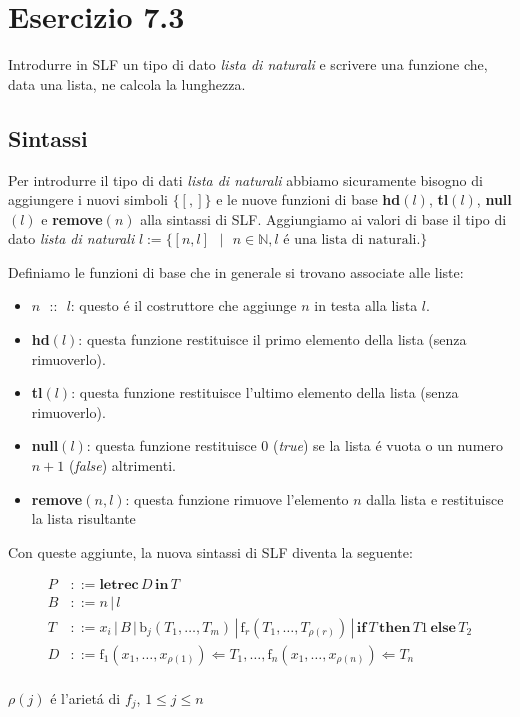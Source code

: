 		\newpage
		
	\section{Esercizio 7.3}
		\qquad Introdurre in SLF un tipo di dato \emph{lista di naturali} e scrivere
		una funzione che, data una lista, ne calcola la lunghezza.
		
		\sectionline
		
		\subsection{Sintassi}
		
		\qquad Per introdurre il tipo di dati \emph{lista di naturali} abbiamo
		sicuramente bisogno di aggiungere i nuovi simboli $\{[,]\}$ e le nuove
		funzioni di base \textbf{hd}$(l)$, \textbf{tl}$(l)$, \textbf{null}$(l)$ e
		\textbf{remove}$(n)$ alla sintassi di SLF. Aggiungiamo ai valori di base il tipo di dato
		\emph{lista di naturali} $l := \{[n,l]\text{ }|\text{ }n \in
		\mathbb{N},l\text{ \'e una lista di naturali.}\}$
		
		Definiamo le funzioni di base che in generale si trovano associate alle
		liste:
		\begin{itemize}
		  \item $n\text{ }\textbf{::}\text{ }l$: questo \'e il costruttore che aggiunge
		  $n$ in testa alla lista $l$.
		  \item \textbf{hd}$(l)$: questa funzione restituisce il primo elemento della
		  lista (senza rimuoverlo).
		  \item \textbf{tl}$(l)$: questa funzione restituisce l'ultimo elemento della
		  lista (senza rimuoverlo).
		  \item \textbf{null}$(l)$: questa funzione restituisce $0$ (\emph{true})
		  se la lista \'e vuota o un numero $n+1$ (\emph{false}) altrimenti.
		  \item \textbf{remove}$(n,l)$: questa funzione rimuove l'elemento $n$ dalla
		  lista e restituisce la lista risultante
		\end{itemize}

		Con queste aggiunte, la nuova sintassi di SLF diventa la seguente:
		
		\begin{align*}
			P & ::= \textbf{letrec} \, D \, \textbf{in} \, T\\
			B & ::= n \, | \, l\\
			T & ::= x_i \, | \, B \, | \, \text{b}_j(T_1,\dots,T_m) \, | \, \text{f}_r(T_1,\dots,T_{\rho(r)}) \, | \, \textbf{if} \, T \, \textbf{then} \, T1 \, \textbf{else} \, T_2\\
			D & ::= \text{f}_1(x_1,\dots,x_{\rho(1)})\Leftarrow T_1,\dots,\text{f}_n(x_1,\dots,x_{\rho(n)}) \Leftarrow T_n\\ 
		\end{align*}
		\vspace{-16 mm}
		\begin{flushright}
			$\rho(j)$ \'e l'ariet\'a di $f_j$, $1\leq j\leq n$
		\end{flushright}
		
